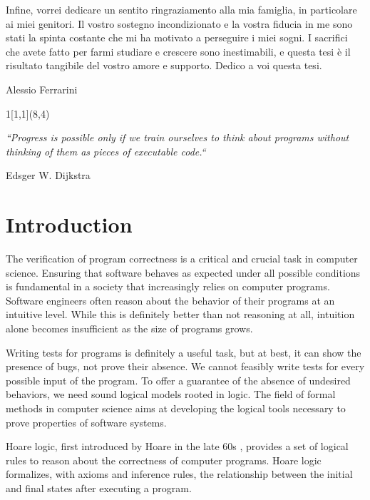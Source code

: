 \documentclass[
  10pt,       %
  twoside,    %
  a4paper,    %
  english,    %
  tikz,       %
  openright,  %
]{book}
\begin{document}
Infine, vorrei dedicare un sentito ringraziamento alla mia famiglia, in
particolare ai miei genitori. Il vostro sostegno incondizionato e la vostra
fiducia in me sono stati la spinta costante che mi ha motivato a perseguire i
miei sogni. I sacrifici che avete fatto per farmi studiare e crescere sono
inestimabili, e questa tesi è il risultato tangibile del vostro amore e
supporto. Dedico a voi questa tesi.

\bigskip
Alessio Ferrarini

\begin{textblock}{1}[1,1](8,4)
  \epigraph{\textit{``Progress is possible only if we train ourselves to think 
  about programs without thinking of them as pieces of executable code.``}}
  {Edsger W. Dijkstra}
\end{textblock}


\endgroup
\cleardoublepage

\cleardoublepage

\begingroup
\hypersetup{linkcolor=black}
\tableofcontents
\endgroup

\cleardoublepage
\mainmatter

\chapter*{Introduction}

The verification of program correctness is a critical and crucial task in
computer science. Ensuring that software behaves as expected under all possible
conditions is fundamental in a society that increasingly relies on computer
programs. Software engineers often reason about the behavior of their programs
at an intuitive level. While this is definitely better than not reasoning at
all, intuition alone becomes insufficient as the size of programs grows.

Writing tests for programs is definitely a useful task, but at best, it can
show the presence of bugs, not prove their absence. We cannot feasibly write
tests for every possible input of the program. To offer a guarantee of the
absence of undesired behaviors, we need sound logical models rooted in logic.
The field of formal methods in computer science aims at developing the logical
tools necessary to prove properties of software systems.

Hoare logic, first introduced by Hoare in the late 60s \cite{Hoare69}, provides
a set of logical rules to reason about the correctness of computer programs.
Hoare logic formalizes, with axioms and inference rules, the relationship
between the initial and final states after executing a program.
\end{document}
